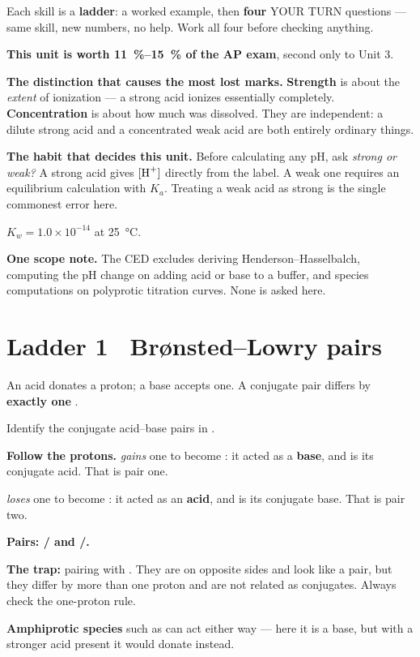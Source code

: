 \documentclass{apchem-worksheet}
\begin{document}
\apctitleblock

\begin{apcnote}
Each skill is a \textbf{ladder}: a worked example, then \textbf{four}
YOUR TURN questions --- same skill, new numbers, no help. Work all four
before checking anything.

\textbf{This unit is worth \SI{11}{\percent}--\SI{15}{\percent} of the AP
exam}, second only to Unit 3.

\textbf{The distinction that causes the most lost marks.}
\textbf{Strength} is about the \emph{extent} of ionization ---
a strong acid ionizes essentially completely. \textbf{Concentration} is
about how much was dissolved. They are independent: a dilute strong acid
and a concentrated weak acid are both entirely ordinary things.

\textbf{The habit that decides this unit.} Before calculating any pH, ask
\emph{strong or weak?} A strong acid gives $[\ce{H+}]$ directly from the
label. A weak one requires an equilibrium calculation with $K_a$. Treating
a weak acid as strong is the single commonest error here.

$K_w = 1.0\times10^{-14}$ at \SI{25}{\celsius}.

\textbf{One scope note.} The CED excludes deriving
Henderson--Hasselbalch, computing the pH change on adding acid or base to
a buffer, and species computations on polyprotic titration curves. None is
asked here.
\end{apcnote}

\section*{\sffamily Ladder 1 \textbullet\ Br\o{}nsted--Lowry pairs}

An acid donates a proton; a base accepts one. A conjugate pair differs by
\textbf{exactly one} .

\begin{workedexample}
Identify the conjugate acid--base pairs in
.

\textbf{Follow the protons.}  \emph{gains} one to become
: it acted as a \textbf{base}, and  is its conjugate
acid. That is pair one.

 \emph{loses} one to become : it acted as an
\textbf{acid}, and  is its conjugate base. That is pair two.

\textbf{Pairs: / and /.}

\textbf{The trap:} pairing  with . They are on opposite
sides and look like a pair, but they differ by more than one proton and
are not related as conjugates. Always check the one-proton rule.

\textbf{Amphiprotic species} such as  can act either way ---
here it is a base, but with a stronger acid present it would donate
instead.
\end{workedexample}
\end{document}
